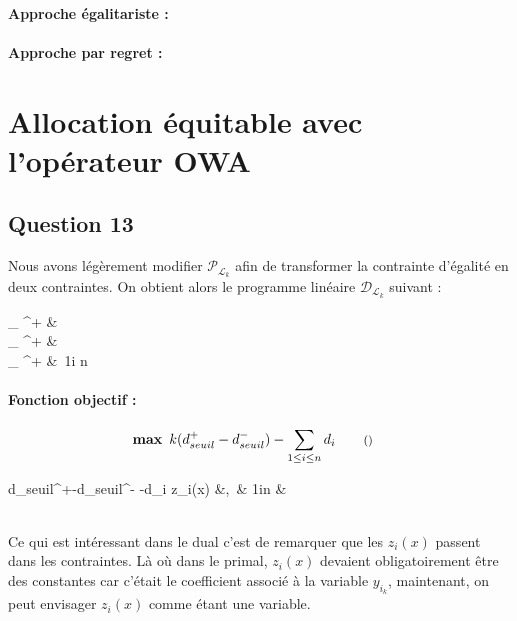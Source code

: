 \documentclass[a4paper, titlepage, oneside, 12pt]{article}%
\newcommand\boldmax{\mathop{\mathbf{max}}}
\newenvironment{fonctionobj}
{ \paragraph{Fonction objectif :}


  }
{  }
\newcommand{\variable}[4]{\underbrace{#1}_{\mathclap{\text{#4}}} \in #2 &\ #3 \\}
\newcommand{\fobj}[2]{\begin{alignat*}{2} #1 &\qquad \text{\footnotesize (#2)} \end{alignat*}}
\newcommand{\constraint}[3]{#1 &,\ & #2 & 
\if\relax\detokenize{#3}\relax
\\
\else
\qquad \text{\footnotesize \textcolor{blue}{\textit{#3}}} \\ 
\fi}
\begin{document}
\paragraph{Approche égalitariste :}

\paragraph{Approche par regret : }

\section{Allocation équitable avec l'opérateur OWA}
\subsection{Question 13}

Nous avons légèrement modifier $\mathcal{P}_{\mathcal{L}_k}$ afin de transformer la contrainte d'égalité en deux contraintes. On obtient alors le programme linéaire $\mathcal{D}_{\mathcal{L}_k}$ suivant :
\begin{mdframed}[style=MyFrame]


\begin{variables}
\variable{d_{seuil}^+}{^+}{}{}
\variable{d_{seuil}^-}{^+}{}{}
\variable{d_{i}}{\mathbb{R}^+}{1\leq i \leq n}{}
\end{variables}

\begin{fonctionobj}
\fobj{\boldmax \ k(d_{seuil}^+ -d_{seuil}^-) -\sum_{\substack{1\leq i \leq n}} d_i} {}
\end{fonctionobj}

\begin{contraintes}
    \constraint{d_{seuil}^+-d_{seuil}^- -d_i \leq z_i(x)}{ 1\leq i\leq n}{}
\end{contraintes}
\end{mdframed}

Ce qui est intéressant dans le dual c'est de remarquer que les $z_i(x)$ passent dans les contraintes. Là où dans le primal, $z_i(x)$ devaient obligatoirement être des constantes car c'était le coefficient associé à la variable $y_{i_k}$, maintenant, on peut envisager $z_i(x)$ comme étant une variable.
\end{document}

